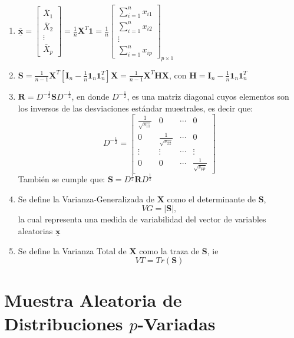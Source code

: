 \documentclass[
]{book}
\theoremstyle{definition}
\theoremstyle{definition}
\theoremstyle{definition}
\theoremstyle{definition}
\theoremstyle{remark}
\begin{document}
\begin{enumerate}
\def\labelenumi{\arabic{enumi}.}
\item
  \(\underline{\overline{\mathbf{x}}}=\begin{bmatrix}\overline{X}_1 \\ \overline{X}_2 \\ \vdots \\ \overline{X}_p\end{bmatrix}=\frac{1}{n}\mathbf{X}^T\mathbf{1}=\frac{1}{n}\begin{bmatrix}
  \sum_{i=1}^n x_{i1}\\
  \sum_{i=1}^n x_{i2}\\
  \vdots  \\
  \sum_{i=1}^n x_{ip}
  \end{bmatrix}_{p\times 1}\)
\item
  \(\mathbf{S}=\frac{1}{n-1}\mathbf{X}^T[\mathbf{I}_n-\frac{1}{n}\mathbf{1}_n\mathbf{1}_n^T]\mathbf{X}=\frac{1}{n-1}\mathbf{X}^T\mathbf{H}\mathbf{X}\), con \(\mathbf{H}=\mathbf{I}_n-\frac{1}{n}\mathbf{1}_n\mathbf{1}_n^T\)
\item
  \(\mathbf{R}=D^{-\frac{1}{2}}\mathbf{S}D^{-\frac{1}{2}}\), en donde \(D^{-\frac{1}{2}}\), es una matriz diagonal cuyos elementos son los inversos de las desviaciones estándar muestrales, es decir que:
  \[
  D^{-\frac{1}{2}}=\begin{bmatrix}
  \frac{1}{\sqrt{s_{11}}} & 0 & \cdots & 0 \\
  0 & \frac{1}{\sqrt{s_{22}}} & \cdots & 0\\
  \vdots & \vdots & \cdots & \vdots \\
  0 & 0 &  \cdots & \frac{1}{\sqrt{s_{pp}}}
  \end{bmatrix}
  \]
  También se cumple que: \(\mathbf{S}=D^{\frac{1}{2}}\mathbf{R}D^{\frac{1}{2}}\)
\item
  Se define la Varianza-Generalizada de \(\mathbf{X}\) como el determinante de \(\mathbf{S}\),
  \[
  VG=| \mathbf{S}|,
  \]
  la cual representa una medida de variabilidad del vector de variables aleatorias \(\underline{\mathbf{x}}\)
\item
  Se define la Varianza Total de \(\mathbf{X}\) como la traza de \(\mathbf{S}\), ie
  \[
  VT=Tr(\mathbf{S})
  \]
\end{enumerate}

\hypertarget{muestra-aleatoria-de-distribuciones-p-variadas}{%
\section{\texorpdfstring{Muestra Aleatoria de Distribuciones \(p\)-Variadas}{Muestra Aleatoria de Distribuciones p-Variadas}}\label{muestra-aleatoria-de-distribuciones-p-variadas}}
\end{document}

